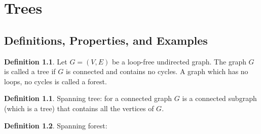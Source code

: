 \documentclass[letter]{book}
\theoremstyle{definition}
\theoremstyle{definition}
\newtheorem*{mydef*}{Definition}
\newtheorem{mydef}{Definition}[chapter]
\theoremstyle{remark}
\begin{document}
\setcounter{chapter}{11}
\chapter{Trees}
\section{Definitions, Properties, and Examples}
\begin{mydef}
    Let $G=(V,E)$ be a loop-free undirected graph. The graph $G$ is called a tree if $G$ is connected and contains no cycles. A graph which has no loops, no cycles is called a forest.
\end{mydef}
\bigskip
\begin{mydef*}
    Spanning tree: for a connected graph $G$ is a connected subgraph (which is a tree) that contains all the vertices of $G$.
\end{mydef*}
\bigskip
\begin{mydef*}
    Spanning forest:
\end{mydef*}
\bigskip
\end{document}
